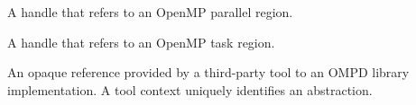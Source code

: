 {
\glossarydefstart
A handle that refers to an OpenMP parallel region. 
\glossarydefend

\glossarydefstart
A handle that refers to an OpenMP task region. 
\glossarydefend

\glossarydefstart
An opaque reference provided by a third-party tool to an OMPD library implementation. A tool context uniquely identifies an abstraction.
\glossarydefend

}
